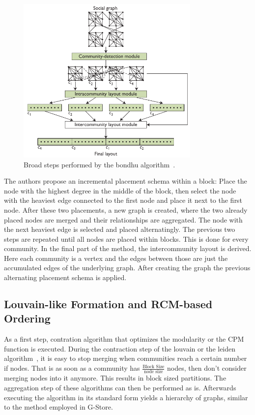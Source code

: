     \begin{figure}[htp]
        \begin{center}
            \includegraphics[keepaspectratio,width=0.8\textwidth]{img/06-rel_w/bondhu.png}
        \end{center}
        \caption{Broad steps performed by the bondhu algorithm~\autocite{hoque2012disk}.} 
        \label{bondhu-fig}
    \end{figure}

    The authors propose an incremental placement schema within a block:
    Place the node with the highest degree in the middle of the block, then select the node with the heaviest edge connected to the first node and place it next to the first node. 
    After these two placements, a new graph is created, where the two already placed nodes are merged and their relationships are aggregated. 
    The node with the next heaviest edge is selected and placed alternatingly. The previous two steps are repeated until all nodes are placed within blocks.
    This is done for every community.
    In the final part of the method, the intercommunity layout is derived. 
    Here each community is a vertex and the edges between those are just the accumulated edges of the underlying graph. 
    After creating the graph the previous alternating placement schema is applied.
    
    \subsection{Louvain-like Formation and RCM-based Ordering}
        As a first step, contration algorithm that optimizes the modularity or the CPM~\autocite{traag2011narrow, potts1952some} function is executed.
        During the contraction step of the louvain or the leiden algorithm~\autocite{traag2019louvain}, it is easy to stop merging when communities reach a certain number if nodes.
        That is as soon as a community has $\frac{\text{Block Size}}{\text{node size}}$ nodes, then don't consider merging nodes into it anymore.
        This results in block sized partitions.
        The aggregation step of these algorithms can then be performed as is. 
        Afterwards executing the algorithm in its standard form yields a hierarchy of graphs, similar to the method employed in G-Store.
    
